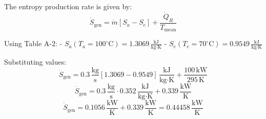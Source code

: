 The entropy production rate is given by:  
\[
\dot{S}_{\text{gen}} = \dot{m} \left[ S_a - S_e \right] + \frac{\dot{Q}_R}{T_{\text{mean}}}
\]  

Using Table A-2:  
- \( S_a (T_a = 100^\circ\text{C}) = 1.3069 \, \frac{\text{kJ}}{\text{kg·K}} \)  
- \( S_e (T_e = 70^\circ\text{C}) = 0.9549 \, \frac{\text{kJ}}{\text{kg·K}} \)  

Substituting values:  
\[
\dot{S}_{\text{gen}} = 0.3 \, \frac{\text{kg}}{\text{s}} \left[ 1.3069 - 0.9549 \right] \, \frac{\text{kJ}}{\text{kg·K}} + \frac{100 \, \text{kW}}{295 \, \text{K}}
\]  
\[
\dot{S}_{\text{gen}} = 0.3 \, \frac{\text{kg}}{\text{s}} \cdot 0.352 \, \frac{\text{kJ}}{\text{kg·K}} + 0.339 \, \frac{\text{kW}}{\text{K}}
\]  
\[
\dot{S}_{\text{gen}} = 0.1056 \, \frac{\text{kW}}{\text{K}} + 0.339 \, \frac{\text{kW}}{\text{K}} = 0.44458 \, \frac{\text{kW}}{\text{K}}
\]